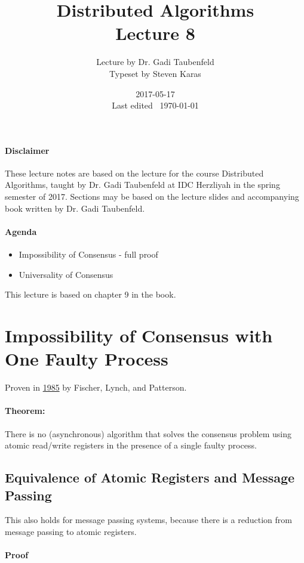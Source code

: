 \documentclass{idc_msc}
\title{Distributed Algorithms\\\large Lecture 8}
\date{2017-05-17 \\ Last edited \currenttime\ \today}
\author{Lecture by Dr. Gadi Taubenfeld\\Typeset by Steven Karas}
\begin{document}
\maketitle

\paragraph{Disclaimer}

These lecture notes are based on the lecture for the course Distributed Algorithms, taught by Dr. Gadi Taubenfeld at IDC Herzliyah in the spring semester of 2017.
Sections may be based on the lecture slides and accompanying book written by Dr. Gadi Taubenfeld.

\paragraph{Agenda}

\begin{itemize}
  \item Impossibility of Consensus - full proof
  \item Universality of Consensus
\end{itemize}

This lecture is based on chapter 9 in the book.

\section{Impossibility of Consensus with One Faulty Process}

Proven in \href{http://cs-www.cs.yale.edu/homes/arvind/cs425/doc/fischer.pdf}{1985} by Fischer, Lynch, and Patterson.

\paragraph{Theorem:}
There is no (asynchronous) algorithm that solves the consensus problem using atomic read/write registers in the presence of a single faulty process.

\subsection{Equivalence of Atomic Registers and Message Passing}

This also holds for message passing systems, because there is a reduction from message passing to atomic registers.

\paragraph{Proof}
\end{document}
